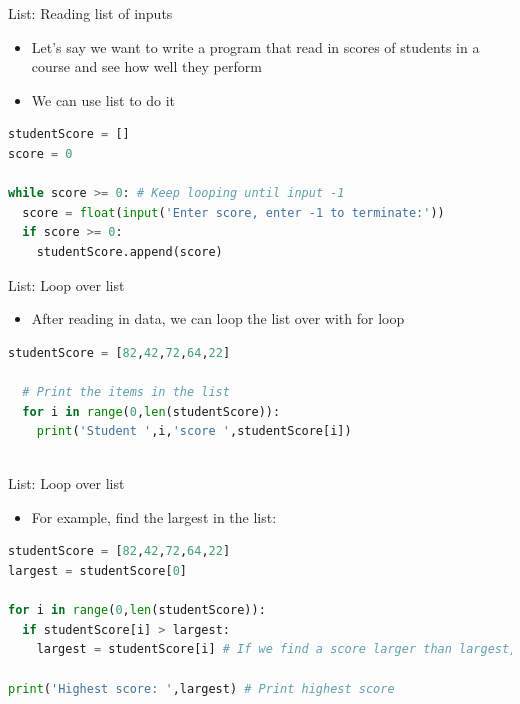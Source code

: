 \documentclass[10pt,xcolor={table,dvipsnames},t]{beamer}
\begin{document}
\begin{frame}[fragile]{List: Reading list of inputs}
  \begin{itemize}
    \item Let's say we want to write a program that read in scores of students in a course and see how well they perform
    \item We can use list to do it
  \end{itemize}
\begin{lstlisting}[language=python]
studentScore = []
score = 0

while score >= 0: # Keep looping until input -1
  score = float(input('Enter score, enter -1 to terminate:'))
  if score >= 0:
    studentScore.append(score)
\end{lstlisting}
\end{frame}

\begin{frame}[fragile]{List: Loop over list}
  \begin{itemize}
    \item After reading in data, we can loop the list over with for loop
  \end{itemize}
\begin{lstlisting}[language=python]
  studentScore = [82,42,72,64,22]

  # Print the items in the list
  for i in range(0,len(studentScore)):
    print('Student ',i,'score ',studentScore[i])
  
\end{lstlisting}
\end{frame}

\begin{frame}[fragile]{List: Loop over list}
  \begin{itemize}
    \item For example, find the largest in the list:
  \end{itemize}
\begin{lstlisting}[language=python]
studentScore = [82,42,72,64,22]
largest = studentScore[0]

for i in range(0,len(studentScore)):
  if studentScore[i] > largest:
    largest = studentScore[i] # If we find a score larger than largest, update largest score 
  
print('Highest score: ',largest) # Print highest score
\end{lstlisting}
\end{frame}
\end{document}
